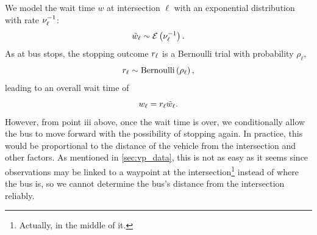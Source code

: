 We model the wait time $w$ at intersection $\ell$ with an exponential distribution with rate $\nu_\ell^{-1}$:
\begin{equation}
\label{eq:int_wait}
\tilde w_\ell \sim \mathcal{E}\left(\nu_\ell^{-1}\right).
\end{equation}
As at bus stops, the stopping outcome $r_\ell$ is a Bernoulli trial with probability $\rho_\ell$,
\begin{equation}
\label{eq:int_stop_bern}
r_\ell \sim \mathrm{Bernoulli}\left(\rho_\ell\right),
\end{equation}
leading to an overall wait time of
\begin{equation}
\label{eq:int_total_wait}
w_\ell = r_\ell \tilde w_\ell.
\end{equation}
However, from point iii above, once the wait time is over, we conditionally allow the bus to move forward with the possibility of stopping again. In practice, this would be proportional to the distance of the vehicle from the intersection and other factors. As mentioned in \cref{sec:vp_data}, this is not as easy as it seems since observations may be linked to a waypoint at the intersection\footnote{Actually, in the middle of it.} instead of where the bus is, so we cannot determine the bus's distance from the intersection reliably.
